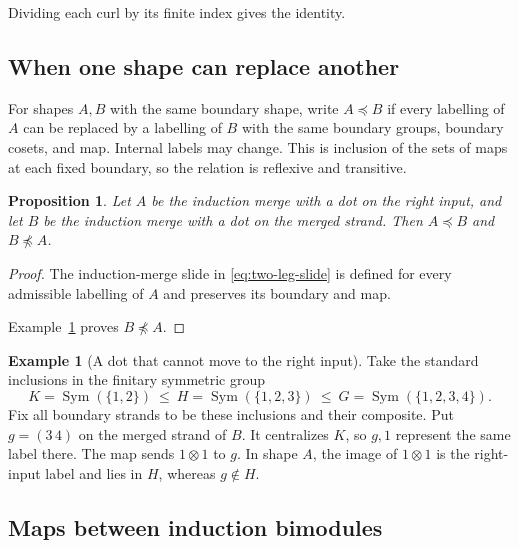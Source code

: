 \documentclass[11pt,a4paper]{article}
\numberwithin{equation}{section}
\newtheorem{proposition}[theorem]{Proposition}
\theoremstyle{definition}
\newtheorem{example}{Example}[section]
\begin{document}
Dividing each curl by its finite index
gives the identity.

\subsection{When one shape can replace another}

For shapes \(A,B\) with the same boundary shape, write \(A\preceq B\)
if every labelling of \(A\) can be replaced by a labelling of \(B\)
with the same boundary groups, boundary cosets, and map. Internal
labels may change. This is inclusion of the sets of maps at each
fixed boundary, so the relation is reflexive and transitive.

\begin{proposition}\label{prop:preorder-not-symmetric}
Let \(A\) be the induction merge with a dot on the right input, and
let \(B\) be the induction merge with a dot on the merged strand. Then
\(A\preceq B\) and \(B\npreceq A\).
\end{proposition}
\begin{proof}
The induction-merge slide in \eqref{eq:two-leg-slide} is defined for
every admissible labelling of \(A\) and preserves its boundary and map.


Example~\ref{ex:dot-slide-obstruction} proves \(B\npreceq A\).
\end{proof}

\begin{example}[A dot that cannot move to the right input]\label{ex:dot-slide-obstruction}
Take the standard inclusions in the finitary symmetric group
\[
   K=\operatorname{Sym}(\{1,2\})\ \le\
   H=\operatorname{Sym}(\{1,2,3\})\ \le\
   G=\operatorname{Sym}(\{1,2,3,4\}).
\]
Fix all boundary strands to be these inclusions and their composite.
Put \(g=(3\,4)\) on the merged strand of \(B\). It centralizes
\(K\), so \(g,1\) represent the same label there. The map sends
\(1\otimes1\) to \(g\). In shape \(A\), the image of \(1\otimes1\)
is the right-input label and lies in \(H\), whereas \(g\notin H\).
\end{example}


\subsection{Maps between induction bimodules}
\end{document}
